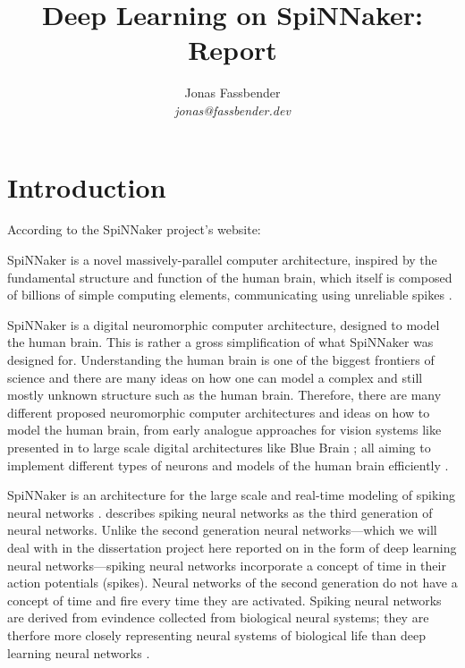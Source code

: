 \documentclass{article}
\begin{document}

\title{Deep Learning on SpiNNaker: Report}
\author{Jonas Fassbender \\ \textit{jonas@fassbender.dev}}
\date{}

\makeEPCCtitle

\newpage

\begin{abstract}
\end{abstract}

\newpage

\tableofcontents

\newpage


\section{Introduction} %
\label{sec:intro}

According to the SpiNNaker project's website:
\begin{displayquote}
  SpiNNaker is a novel massively-parallel computer
  architecture, inspired by the fundamental structure and
  function of the human brain, which itself is composed of
  billions of simple computing elements, communicating
  using unreliable spikes \citep{spinn_proj}.
\end{displayquote}

SpiNNaker is a digital neuromorphic computer architecture,
designed to model the human brain.
This is rather a gross simplification of what SpiNNaker was
designed for.
Understanding the human brain is one of the biggest
frontiers of science and there are many ideas on how one
can model a complex and still mostly unknown structure such
as the human brain.
Therefore, there are many different proposed neuromorphic
computer architectures and ideas on how to model the human
brain, from early analogue approaches for vision systems
like presented in \citet{mead1989} to large scale digital
architectures like Blue Brain \citep{markram2006}; all
aiming to implement different types of neurons and models
of the human brain efficiently \citep{furber_et_al_2007}.

SpiNNaker is an architecture for the large scale and
real-time modeling of spiking neural networks
\citep{furber_et_al_2006, furber_et_al_2006b,
  furber_et_al_2007}.
\citet{maass1997} describes spiking neural networks as the
third generation of neural networks.
Unlike the second generation neural networks---which we
will deal with in the dissertation project here reported on
in the form of deep learning neural networks---spiking
neural networks incorporate a concept of time in their
action potentials (spikes).
Neural networks of the second generation do not have a
concept of time and fire every time they are activated.
Spiking neural networks are derived from evindence
collected from biological neural systems; they are therfore
more closely representing neural systems of biological
life than deep learning neural networks \citep{maass1997}.
\end{document}
